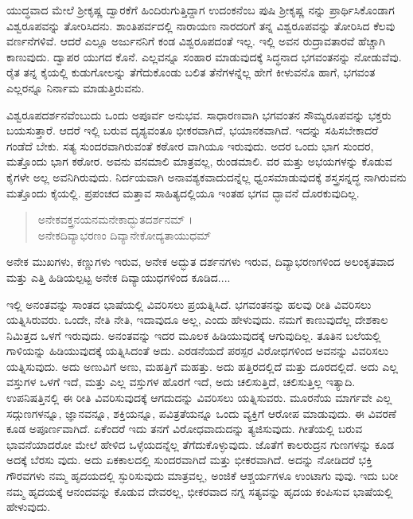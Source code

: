 ಯುದ್ಧವಾದ ಮೇಲೆ ಶ್ರೀಕೃಷ್ಣ ದ್ವಾರಕೆಗೆ ಹಿಂದಿರುಗುತ್ತಿದ್ದಾಗ ಉದಂಕನೆಂಬ ಪುಷಿ ಶ್ರೀಕೃಷ್ಣ ನನ್ನು ಪ್ರಾರ್ಥಿಸಿಕೊಂಡಾಗ ವಿಶ್ವರೂಪವನ್ನು ತೋರಿಸಿದನು. ಶಾಂತಿಪರ್ವದಲ್ಲಿ ನಾರಾಯಣ ನಾರದರಿಗೆ ತನ್ನ ವಿಶ್ವರೂಪವನ್ನು ತೋರಿಸಿದ ಕೆಲವು ವರ್ಣನೆಗಳಿವೆ. ಆದರೆ ಎಲ್ಲೂ ಅರ್ಜುನನಿಗೆ ಕಂಡ ವಿಶ್ವರೂಪದಂತೆ ಇಲ್ಲ. ಇಲ್ಲಿ ಅವನ ರುದ್ರಾವತಾರವೆ ಹೆಚ್ಚಾಗಿ ಕಾಣುವುದು. ದ್ವಾಪರ ಯುಗದ ಕೊನೆ. ಎಲ್ಲವನ್ನೂ ಸಂಹಾರ ಮಾಡುವುದಕ್ಕೆ ಸಿದ್ಧನಾದ ಭಗವಂತನನ್ನು ನೋಡುವೆವು. ರೈತ ತನ್ನ ಕೈಯಲ್ಲಿ ಕುಡುಗೋಲನ್ನು ತೆಗೆದುಕೊಂಡು ಬಲಿತ ತೆನೆಗಳನ್ನೆಲ್ಲ ಹೇಗೆ ಕೀಳುವನೊ ಹಾಗೆ, ಭಗವಂತ ಎಲ್ಲರನ್ನೂ ನಿರ್ನಾಮ ಮಾಡುತ್ತಿರುವನು.

ವಿಶ್ವರೂಪದರ್ಶನವೆಂಬುದು ಒಂದು ಅಪೂರ್ವ ಅನುಭವ. ಸಾಧಾರಣವಾಗಿ ಭಗವಂತನ ಸೌಮ್ಯರೂಪವನ್ನು ಭಕ್ತರು ಬಯಸುತ್ತಾರೆ. ಆದರೆ ಇಲ್ಲಿ ಬರುವ ದೃಶ್ಯವಂತೂ ಭೀಕರವಾಗಿದೆ, ಭಯಾನಕವಾಗಿದೆ. ಇದನ್ನು ಸಹಿಸಬೇಕಾದರೆ ಗಂಡೆದೆ ಬೇಕು. ಸತ್ಯ ಸುಂದರವಾಗಿರುವಂತೆ ಕಠೋರ ವಾಗಿಯೂ ಇರುವುದು. ಅದರ ಒಂದು ಭಾಗ ಸುಂದರ, ಮತ್ತೊಂದು ಭಾಗ ಕಠೋರ. ಅವನು ವನಮಾಲಿ ಮಾತ್ರವಲ್ಲ, ರುಂಡಮಾಲಿ. ವರ ಮತ್ತು ಅಭಯಗಳನ್ನು ಕೊಡುವ ಕೈಗಳೇ ಅಲ್ಲ ಅವನಿಗಿರುವುದು. ನಿರ್ದಯವಾಗಿ ಅನಾವಶ್ಯಕವಾದುದನ್ನೆಲ್ಲ ಧ್ವಂಸಮಾಡುವುದಕ್ಕೆ ಶಸ್ತ್ರಸನ್ನದ್ಧ ನಾಗಿರುವನು ಮತ್ತೊಂದು ಕೈಯಲ್ಲಿ. ಪ್ರಪಂಚದ ಮತ್ತಾವ ಸಾಹಿತ್ಯದಲ್ಲಿಯೂ ಇಂತಹ ಭಗವ ದ್ಭಾವನೆ ದೊರಕುವುದಿಲ್ಲ.

\begin{verse}
ಅನೇಕವಕ್ತ್ರನಯನಮನೇಕಾದ್ಭುತದರ್ಶನಮ್ ।\\ಅನೇಕದಿವ್ಯಾಭರಣಂ ದಿವ್ಯಾನೇಕೋದ್ಯತಾಯುಧಮ್ 
\end{verse}

{\small ಅನೇಕ ಮುಖಗಳು, ಕಣ್ಣುಗಳು ಇರುವ, ಅನೇಕ ಅದ್ಭುತ ದರ್ಶನಗಳು ಇರುವ, ದಿವ್ಯಾಭರಣಗಳಿಂದ ಅಲಂಕೃತವಾದ ಮತ್ತು ಎತ್ತಿ ಹಿಡಿಯಲ್ಪಟ್ಟ ಅನೇಕ ದಿವ್ಯಾಯುಧಗಳಿಂದ ಕೂಡಿದ....}

ಇಲ್ಲಿ ಅನಂತವನ್ನು ಸಾಂತದ ಭಾಷೆಯಲ್ಲಿ ವಿವರಿಸಲು ಪ್ರಯತ್ನಿಸಿದೆ. ಭಗವಂತನನ್ನು ಹಲವು ರೀತಿ ವಿವರಿಸಲು ಯತ್ನಿಸಿರುವರು. ಒಂದೇ, ನೇತಿ ನೇತಿ, ಇದಾವುದೂ ಅಲ್ಲ, ಎಂದು ಹೇಳುವುದು. ನಮಗೆ ಕಾಣುವುದೆಲ್ಲ ದೇಶಕಾಲ ನಿಮಿತ್ತದ ಒಳಗೆ ಇರುವುದು. ಅನಂತವನ್ನು ಇದರ ಮೂಲಕ ಹಿಡಿಯುವುದಕ್ಕೆ ಆಗುವುದಿಲ್ಲ. ತೂತಿನ ಬಲೆಯಲ್ಲಿ ಗಾಳಿಯನ್ನು ಹಿಡಿಯುವುದಕ್ಕೆ ಯತ್ನಿಸಿದಂತೆ ಅದು. ಎರಡನೆಯದೆ ಪರಸ್ಪರ ವಿರೋಧಗಳಿಂದ ಅವನನ್ನು ವಿವರಿಸಲು ಯತ್ನಿಸುವುದು. ಅದು ಅಣುವಿಗೆ ಅಣು, ಮಹತ್ತಿಗೆ ಮಹತ್ತು. ಅದು ಹತ್ತಿರದಲ್ಲಿದೆ ಮತ್ತು ದೂರದಲ್ಲಿದೆ. ಅದು ಎಲ್ಲ ವಸ್ತುಗಳ ಒಳಗೆ ಇದೆ, ಮತ್ತು ಎಲ್ಲ ವಸ್ತುಗಳ ಹೊರಗೆ ಇದೆ, ಅದು ಚಲಿಸುತ್ತಿದೆ, ಚಲಿಸುತ್ತಿಲ್ಲ ಇತ್ಯಾದಿ. ಉಪನಿಷತ್ತಿನಲ್ಲಿ ಈ ರೀತಿ ವಿವರಿಸುವುದಕ್ಕೆ ಆಗದುದನ್ನು ವಿವರಿಸಲು ಯತ್ನಿಸುವರು. ಮೂರನೆಯ ಮಾರ್ಗವೇ ಎಲ್ಲ ಸದ್ಗುಣಗಳನ್ನೂ, ಜ್ಞಾನವನ್ನೂ, ಶಕ್ತಿಯನ್ನೂ, ಪವಿತ್ರತೆಯನ್ನೂ ಒಂದು ವ್ಯಕ್ತಿಗೆ ಆರೋಪ ಮಾಡುವುದು. ಈ ವಿವರಣೆ ಕೂಡ ಅಪೂರ್ಣವಾಗಿದೆ. ಏಕೆಂದರೆ ಇದು ತನಗೆ ವಿರೋಧವಾದುದನ್ನು ತ್ಯಜಿಸುವುದು. ಗೀತೆಯಲ್ಲಿ ಬರುವ ಭಾವನೆಯಾದರೋ ಮೇಲೆ ಹೇಳಿದ ಒಳ್ಳೆಯದನ್ನೆಲ್ಲ ತೆಗೆದುಕೊಳ್ಳುವುದು. ಜೊತೆಗೆ ಕಾಲರುದ್ರನ ಗುಣಗಳನ್ನು ಕೂಡ ಅದಕ್ಕೆ ಬೆರಸು ವುದು. ಅದು ಏಕಕಾಲದಲ್ಲಿ ಸುಂದರವಾಗಿದೆ ಮತ್ತು ಭೀಕರವಾಗಿದೆ. ಅದನ್ನು ನೋಡಿದರೆ ಭಕ್ತಿ ಗೌರವಗಳು ನಮ್ಮ ಹೃದಯದಲ್ಲಿ ಸ್ಫುರಿಸುವುದು ಮಾತ್ರವಲ್ಲ, ಅಂಜಿಕೆ ಆಶ್ಚರ್ಯಗಳೂ ಉಂಟಾಗು ವುವು. ಇದು ಬರೀ ನಮ್ಮ ಹೃದಯಕ್ಕೆ ಆನಂದವನ್ನು ಕೊಡುವ ದೇವರಲ್ಲ, ಭೀಕರವಾದ ನಗ್ನ ಸತ್ಯವನ್ನು ಹೃದಯ ಕಂಪಿಸುವ ಭಾಷೆಯಲ್ಲಿ ಹೇಳುವುದು.

